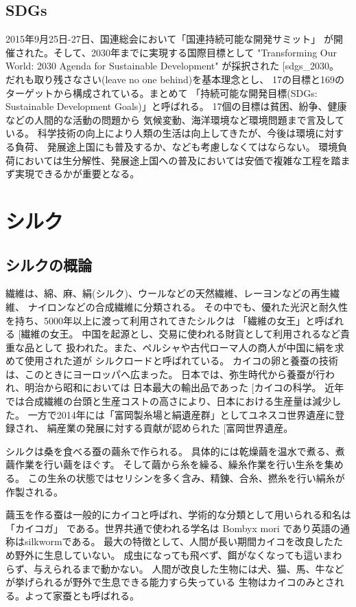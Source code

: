 \documentclass[dvipdfmx,12pt,a4paper]{jreport}
\makeatletter
\DeclareRobustCommand\cite{\unskip
    	\@ifnextchar[{\@tempswatrue\@citex}{\@tempswafalse\@citex[]}}
\makeatother
\begin{document}
		\subsection{SDGs}
		2015年9月25日-27日、国連総会において「国連持続可能な開発サミット」
		が開催された。そして、2030年までに実現する国際目標として
		 "Transforming Our World: 2030 Agenda for Sustainable Development" が採択された\cite{sdgs_2030}。
		だれも取り残さなさい(leave no one behind)を基本理念とし、
		17の目標と169のターゲットから構成されている。まとめて
		「持続可能な開発目標(SDGs: Sustainable Development Goals)」と呼ばれる。
		17個の目標は貧困、紛争、健康などの人間的な活動の問題から
		気候変動、海洋環境など環境問題まで言及している。
		科学技術の向上により人類の生活は向上してきたが、今後は環境に対する負荷、
		発展途上国にも普及するか、なども考慮しなくてはならない。
		環境負荷においては生分解性、発展途上国への普及においては安価で複雑な工程を踏まず実現できるかが重要となる。

			\newpage
		\section{シルク}
		\subsection{シルクの概論}
		繊維は、綿、麻、絹(シルク)、ウールなどの天然繊維、レーヨンなどの再生繊維、
		ナイロンなどの合成繊維に分類される。
		その中でも、優れた光沢と耐久性を持ち、5000年以上に渡って利用されてきたシルクは
		「繊維の女王」と呼ばれる\cite{繊維の女王}。
		中国を起源とし、交易に使われる財貨として利用されるなど貴重な品として
		扱われた。また、ペルシャや古代ローマ人の商人が中国に絹を求めて使用された道が
		シルクロードと呼ばれている。
		カイコの卵と養蚕の技術は、このときにヨーロッパへ広まった。
		日本では、弥生時代から養蚕が行われ、明治から昭和においては
		日本最大の輸出品であった\cite{カイコの科学}。
		近年では合成繊維の台頭と生産コストの高さにより、日本における生産量は減少した。
		一方で2014年には「富岡製糸場と絹遺産群」としてユネスコ世界遺産に登録され、
		絹産業の発展に対する貢献が認められた\cite{富岡世界遺産}。

		シルクは桑を食べる蚕の繭糸で作られる。
		具体的には乾燥繭を温水で煮る、煮繭作業を行い繭をほぐす。
		そして繭から糸を繰る、繰糸作業を行い生糸を集める。
		この生糸の状態ではセリシンを多く含み、精錬、合糸、撚糸を行い絹糸が作製される。
		
		繭玉を作る蚕は一般的にカイコと呼ばれ、学術的な分類として用いられる和名は「カイコガ」
		である。世界共通で使われる学名は Bombyx mori であり英語の通称はsilkwormである。
		最大の特徴として、人間が長い期間カイコを改良したため野外に生息していない。
		成虫になっても飛べず、餌がなくなっても這いまわらず、与えられるまで動かない。
		人間が改良した生物には犬、猫、馬、牛などが挙げられるが野外で生息できる能力すら失っている
		生物はカイコのみとされる。よって家蚕とも呼ばれる。
\end{document}
